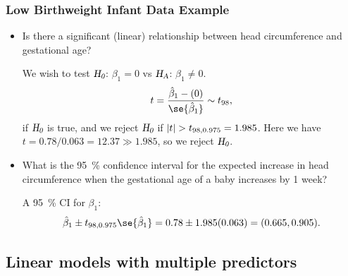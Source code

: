 \documentclass{article}\usepackage[]{graphicx}\usepackage[svgnames]{xcolor}
\newcommand{\HN}{\textsl{H}_{\textsl{0}}}%
\newcommand{\HA}{\textsl{H}_{\textsl{A}}}%
\DeclarePairedDelimiter\abs{\lvert}{\rvert}
\begin{document}
\subsubsection*{Low Birthweight Infant Data Example}
\begin{itemize}
      \item Is there a significant (linear) relationship between head circumference and
            gestational age?

            We wish to test $ \HN $: $ \beta_1=0 $ vs $ \HA $: $ \beta_1\ne 0 $.
            \[ t=\frac{\hat{\beta}_1-(0)}{\se{\hat{\beta}_1}}\sim t_{98}, \]
            if $ \HN $ is true, and we reject $ \HN $ if $ \abs{t}>t_{98,0.975}=1.985 $.
            Here we have $ t=0.78/0.063=12.37\gg 1.985 $, so we reject $ \HN $.
      \item What is the \qty{95}{\percent} confidence interval for the expected increase in head
            circumference when the gestational age of a baby increases by 1 week?

            A \qty{95}{\percent} CI for $ \beta_1 $:
            \[ \hat{\beta}_1\pm t_{98,0.975}\se{\hat{\beta}_1}=0.78\pm 1.985(0.063)=(0.665,0.905). \]
\end{itemize}

\subsection*{Linear models with multiple predictors}
\end{document}
